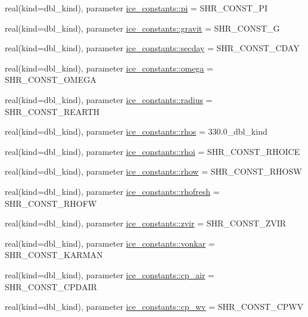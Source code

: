 \begin{DoxyCompactItemize}
\item 
real(kind=dbl\_\-kind), parameter \hyperlink{namespaceice__constants_ab88fe0d16ebc9529ef11d6fe4343c387}{ice\_\-constants::pi} = SHR\_\-CONST\_\-PI
\item 
real(kind=dbl\_\-kind), parameter \hyperlink{namespaceice__constants_ab875779750d9ad8407a02a9ec6bd8bda}{ice\_\-constants::gravit} = SHR\_\-CONST\_\-G
\item 
real(kind=dbl\_\-kind), parameter \hyperlink{namespaceice__constants_a4834c667201b1d05b8a0a0cf79b10742}{ice\_\-constants::secday} = SHR\_\-CONST\_\-CDAY
\item 
real(kind=dbl\_\-kind), parameter \hyperlink{namespaceice__constants_ab975492734f7183079c68d7b88d27146}{ice\_\-constants::omega} = SHR\_\-CONST\_\-OMEGA
\item 
real(kind=dbl\_\-kind), parameter \hyperlink{namespaceice__constants_a7ec9d7c0e7bcd12bc711119922edce91}{ice\_\-constants::radius} = SHR\_\-CONST\_\-REARTH
\item 
real(kind=dbl\_\-kind), parameter \hyperlink{namespaceice__constants_ae2404a45dc46ecdb371055dd52dcfe1f}{ice\_\-constants::rhos} = 330.0\_\-dbl\_\-kind
\item 
real(kind=dbl\_\-kind), parameter \hyperlink{namespaceice__constants_ab8aa44724cb8c314b55a09244600f68d}{ice\_\-constants::rhoi} = SHR\_\-CONST\_\-RHOICE
\item 
real(kind=dbl\_\-kind), parameter \hyperlink{namespaceice__constants_a64fecf2ffd940ef72dbaa94c096930de}{ice\_\-constants::rhow} = SHR\_\-CONST\_\-RHOSW
\item 
real(kind=dbl\_\-kind), parameter \hyperlink{namespaceice__constants_a6aa217bd72fe4e73265e915de96c3665}{ice\_\-constants::rhofresh} = SHR\_\-CONST\_\-RHOFW
\item 
real(kind=dbl\_\-kind), parameter \hyperlink{namespaceice__constants_a87b8d7a8a072b85b26c14b96e443879e}{ice\_\-constants::zvir} = SHR\_\-CONST\_\-ZVIR
\item 
real(kind=dbl\_\-kind), parameter \hyperlink{namespaceice__constants_a16411cd5c8476ea99195954dd945cc44}{ice\_\-constants::vonkar} = SHR\_\-CONST\_\-KARMAN
\item 
real(kind=dbl\_\-kind), parameter \hyperlink{namespaceice__constants_a36c2903a1fdb4ce659dd1012f8abdfae}{ice\_\-constants::cp\_\-air} = SHR\_\-CONST\_\-CPDAIR
\item 
real(kind=dbl\_\-kind), parameter \hyperlink{namespaceice__constants_ab75b8b01ca0c808ceaf81ceaea962456}{ice\_\-constants::cp\_\-wv} = SHR\_\-CONST\_\-CPWV

\end{DoxyCompactItemize}
